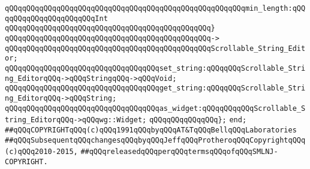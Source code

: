 \verb|qQQqqQQqqQQqqQQqqQQqqQQqqQQqqQQqqQQqqQQqqQQqqQQqqQQqqQQqmin_length:qQQqqQQqqQQqqQQqqQQqqQQqInt|\newline
\verb|qQQqqQQqqQQqqQQqqQQqqQQqqQQqqQQqqQQqqQQqqQQqqQQq}|\newline
\verb|qQQqqQQqqQQqqQQqqQQqqQQqqQQqqQQqqQQqqQQqqQQqqQQq->|\newline
\verb|qQQqqQQqqQQqqQQqqQQqqQQqqQQqqQQqqQQqqQQqqQQqqQQqScrollable_String_Editor;|\newline
\newline
\verb|qQQqqQQqqQQqqQQqqQQqqQQqqQQqqQQqqQQqset_string:qQQqqQQqScrollable_String_EditorqQQq->qQQqStringqQQq->qQQqVoid;|\newline
\verb|qQQqqQQqqQQqqQQqqQQqqQQqqQQqqQQqqQQqget_string:qQQqqQQqScrollable_String_EditorqQQq->qQQqString;|\newline
\newline
\verb|qQQqqQQqqQQqqQQqqQQqqQQqqQQqqQQqqQQqas_widget:qQQqqQQqqQQqScrollable_String_EditorqQQq->qQQqwg::Widget;|\newline
\newline
\verb|qQQqqQQqqQQqqQQq};|\newline
\newline
\verb|end;|\newline
\newline
\verb|##qQQqCOPYRIGHTqQQq(c)qQQq1991qQQqbyqQQqAT&TqQQqBellqQQqLaboratories|\newline
\verb|##qQQqSubsequentqQQqchangesqQQqbyqQQqJeffqQQqProtheroqQQqCopyrightqQQq(c)qQQq2010-2015,|\newline
\verb|##qQQqreleasedqQQqperqQQqtermsqQQqofqQQqSMLNJ-COPYRIGHT.|\newline

